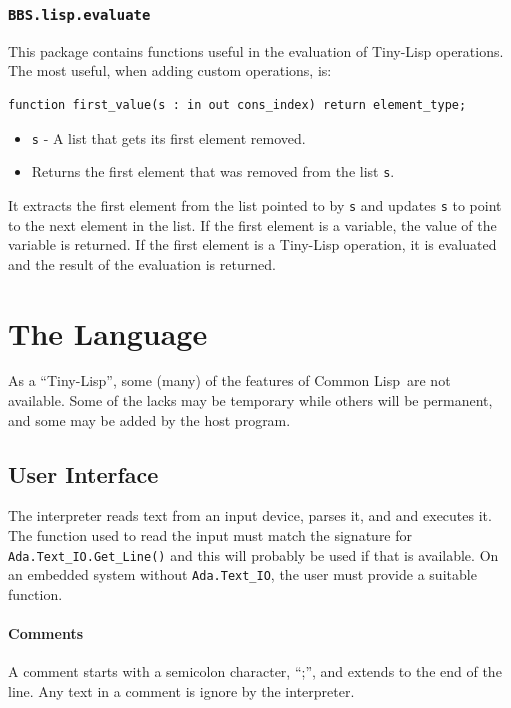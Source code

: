 \documentclass[10pt, openany]{book}
\newcommand{\package}[1]{\texttt{#1}}
\newcommand{\function}[1]{\texttt{#1}}
\newcommand{\keyword}[1]{\texttt{#1}}
\newcommand{\tl}{Tiny-Lisp}
\newcommand{\cl}{Common Lisp}
\begin{document}
\subsection{\package{BBS.lisp.evaluate}}
This package contains functions useful in the evaluation of \tl{} operations.  The most useful, when adding custom operations, is:
\begin{lstlisting}
function first_value(s : in out cons_index) return element_type;
\end{lstlisting}
\begin{itemize}
  \item \keyword{s} - A list that gets its first element removed.
  \item Returns the first element that was removed from the list \keyword{s}.
\end{itemize}
It extracts the first element from the list pointed to by \keyword{s} and updates \keyword{s} to point to the next element in the list.  If the first element is a variable, the value of the variable is returned.  If the first element is a \tl{} operation, it is evaluated and the result of the evaluation is returned.

\chapter{The Language}
As a ``\tl'', some (many) of the features of \cl\ are not available.  Some of the lacks may be temporary while others will be permanent, and some may be added by the host program.

\section{User Interface}
The interpreter reads text from an input device, parses it, and and executes it.  The function used to read the input must match the signature for \function{Ada.Text\_IO.Get\_Line()} and this will probably be used if that is available.  On an embedded system without \package{Ada.Text\_IO}, the user must provide a suitable function.

\subsubsection{Comments}
A comment starts with a semicolon character, ``;'', and extends to the end of the line.  Any text in a comment is ignore by the interpreter.
\end{document}
